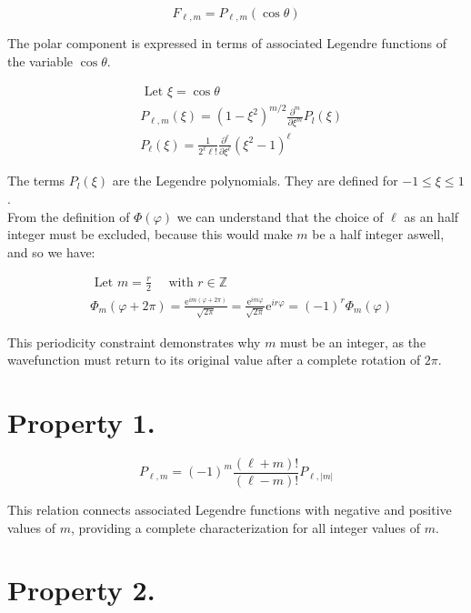 \documentclass[italian]{HKNdocument}
\begin{document}
\begin{equation}
F_{\ell, m}=P_{\ell, m}(\cos \theta) \label{eq:8.44}
\end{equation}

The polar component is expressed in terms of associated Legendre functions of the variable $\cos\theta$.

\begin{align}
& \text { Let } \xi=\cos \theta \\
& P_{\ell, m}(\xi)=\left(1-\xi^{2}\right)^{m / 2} \frac{\partial^{m}}{\partial \xi^{m}} P_{l}(\xi)  \label{eq:8.45}\\
& P_{\ell}(\xi)=\frac{1}{2^{\ell} \ell!} \frac{\partial^{\ell}}{\partial \xi^{\ell}}\left(\xi^{2}-1\right)^{\ell}
\end{align}

The terms $P_{l}(\xi)$ are the Legendre polynomials. They are defined for $-1 \leq \xi \leq 1$.\\
From the definition of $\Phi(\varphi)$ we can understand that the choice of $\ell$ as an half integer must be excluded, because this would make $m$ be a half integer aswell, and so we have:

\begin{align}
& \text { Let } m=\frac{r}{2} \quad \text { with } r \in \mathbb{Z} \\
& \Phi_{m}(\varphi+2 \pi)=\frac{\mathrm{e}^{i m(\varphi+2 \pi)}}{\sqrt{2 \pi}}=\frac{\mathrm{e}^{i m \varphi}}{\sqrt{2 \pi}} \mathrm{e}^{i r \varphi}=(-1)^{r} \Phi_{m}(\varphi) \label{eq:8.46}
\end{align}

This periodicity constraint demonstrates why $m$ must be an integer, as the wavefunction must return to its original value after a complete rotation of $2\pi$.

\section{Property 1.}

\begin{equation}
P_{\ell, m}=(-1)^{m} \frac{(\ell+m)!}{(\ell-m)!} P_{\ell,|m|} \label{eq:8.47}
\end{equation}

This relation connects associated Legendre functions with negative and positive values of $m$, providing a complete characterization for all integer values of $m$.

\section{Property 2.}
\end{document}
